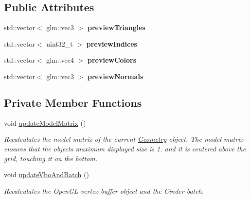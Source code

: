 \subsection*{Public Attributes}
\begin{DoxyCompactItemize}
\item 
\mbox{\label{classpepr3d_1_1_model_view_adbcd7fa73c38c88bda111dd1400e7c82}} 
std\+::vector$<$ glm\+::vec3 $>$ {\bfseries preview\+Triangles}
\item 
\mbox{\label{classpepr3d_1_1_model_view_ae3df7a703a9ea4bec3e28ba409326bda}} 
std\+::vector$<$ uint32\+\_\+t $>$ {\bfseries preview\+Indices}
\item 
\mbox{\label{classpepr3d_1_1_model_view_a7acedc0788dd9115a85bb84ed2e27402}} 
std\+::vector$<$ glm\+::vec4 $>$ {\bfseries preview\+Colors}
\item 
\mbox{\label{classpepr3d_1_1_model_view_afbba4767e833257eaac687cc5d5b1896}} 
std\+::vector$<$ glm\+::vec3 $>$ {\bfseries preview\+Normals}
\end{DoxyCompactItemize}
\subsection*{Private Member Functions}
\begin{DoxyCompactItemize}
\item 
\mbox{\label{classpepr3d_1_1_model_view_a13a0075d890659252e739cb212f5ce1a}} 
void \mbox{\hyperlink{classpepr3d_1_1_model_view_a13a0075d890659252e739cb212f5ce1a}{update\+Model\+Matrix}} ()
\begin{DoxyCompactList}\small\item\em Recalculates the model matrix of the current \mbox{\hyperlink{classpepr3d_1_1_geometry}{Geometry}} object. The model matrix ensures that the object\textquotesingle{}s maximum displayed size is 1. and it is centered above the grid, touching it on the bottom. \end{DoxyCompactList}\item 
\mbox{\label{classpepr3d_1_1_model_view_acd9a0fe559b6443aa3baeae23fd21809}} 
void \mbox{\hyperlink{classpepr3d_1_1_model_view_acd9a0fe559b6443aa3baeae23fd21809}{update\+Vbo\+And\+Batch}} ()
\begin{DoxyCompactList}\small\item\em Recalculates the Open\+GL vertex buffer object and the Cinder batch. \end{DoxyCompactList}\end{DoxyCompactItemize}
